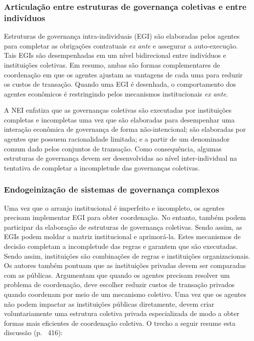 \subsubsection*{Articulação entre estruturas de governança coletivas e entre indivíduos}

Estruturas de governança intra-individuais (EGI) são elaboradas pelos agentes para completar as obrigações contratuais \textit{ex ante} e assegurar a auto-execução. Tais EGIs são desempenhadas em um nível bidirecional entre indivíduos e instituições coletivas. Em resumo, ambas são formas complementares de coordenação em que os agentes ajustam as vantagens de cada uma para reduzir os custos de transação. Quando uma EGI é desenhada, o comportamento dos agentes econômicos é restringindo pelos mecanismos institucionais \textit{ex ante}.

A NEI enfatiza que as governanças coletivas são executadas por instituições completas e incompletas uma vez que são elaboradas para desempenhar uma interação econômica de governança de forma não-intencional; são elaboradas por agentes que possuem racionalidade limitada; e a partir de um denominador comum dado pelos conjuntos de transação. Como consequência, algumas estruturas de governança devem ser desenvolvidas ao nível inter-individual na tentativa de completar a incompletude das governanças coletivas.

\subsubsection*{Endogeinização de sistemas de governança complexos}

Uma vez que o arranjo institucional é imperfeito e incompleto, os agentes precisam implementar EGI para obter coordenação. No entanto, também podem participar da elaboração de estruturas de governança coletivas. Sendo assim, as EGIs podem moldar a matriz institucional e aprimorá-la. Estes mecanismos de decisão completam a incompletude das regras e garantem que são executadas. Sendo assim, instituições são combinações de regras e instituições organizacionais. Os autores também pontuam que as instituições privadas devem ser comparadas com as públicas. Argumentam que quando os agentes precisam resolver um problema de coordenação, deve escolher reduzir custos de transação privados quando coordenam por meio de um mecanismo coletivo. Uma vez que os agentes não podem impactar as instituições públicas diretamente, devem criar voluntariamente uma estrutura coletiva privada especializada de modo a obter formas mais eficientes de coordenação coletiva. O trecho a seguir resume esta discussão (p.~ 416):

